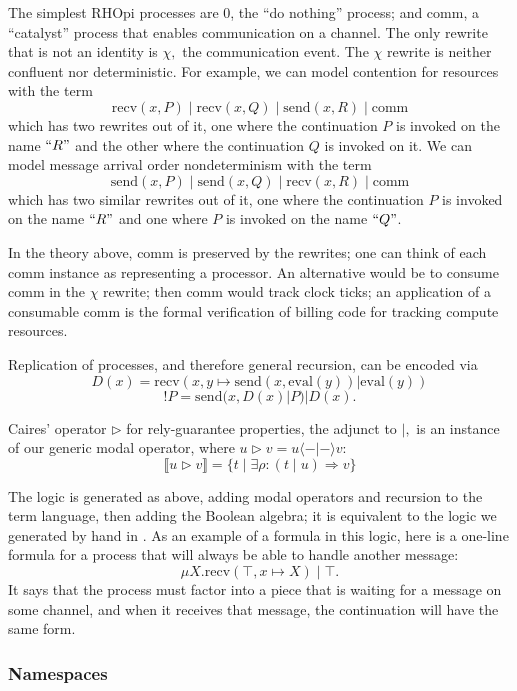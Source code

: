 \documentclass{llncs}
\newcommand{\interp}[1]{\llbracket #1 \rrbracket}
\newcommand{\maps}{\colon}
\renewcommand{\:}{\colon}
\newcommand{\send}{\mathrm{send}}
\newcommand{\recv}{\mathrm{recv}}
\newcommand{\comm}{\mathrm{comm}}
\renewcommand{\quote}[1]{``#1"}
\newcommand{\deref}[1]{\mathrm{eval}(#1)}
\begin{document}
The simplest RHOpi processes are 0, the ``do nothing'' process; and comm, a ``catalyst'' process that enables communication on a channel.  The only rewrite that is not an identity is $\chi,$ the communication event.  The $\chi$ rewrite is neither confluent nor deterministic.  For example, we can model contention for resources with the term
\[ \recv(x, P)\;|\;\recv(x, Q)\;|\;\send(x,R)\;|\;\comm \]
which has two rewrites out of it, one where the continuation $P$ is invoked on the name $\quote{R}$ and the other where the continuation $Q$ is invoked on it.  We can model message arrival order nondeterminism with the term
\[ \send(x, P)\;|\;\send(x, Q)\;|\;\recv(x,R)\;|\;\comm \]
which has two similar rewrites out of it, one where the continuation $P$ is invoked on the name $\quote{R}$ and one where $P$ is invoked on the name $\quote{Q}$.

In the theory above, comm is preserved by the rewrites; one can think of each comm instance as representing a processor.  An alternative would be to consume comm in the $\chi$ rewrite; then comm would track clock ticks; an application of a consumable comm is the formal verification of billing code for tracking compute resources.

Replication of processes, and therefore general recursion, can be encoded \cite{DBLP:journals/entcs/MeredithR05} via
\[D(x) = \recv(x, y\mapsto \send(x, \deref{y}) | \deref{y})\]
\[!P = \send(x, D(x) | P) | D(x).\]

Caires' \cite{Caires} operator $\triangleright$ for rely-guarantee properties, the adjunct to $|,$ is an instance of our generic modal operator, where $u \triangleright v = u \langle - | - \rangle v:$
\[ \interp{u \triangleright v} = \{ t \;|\; \exists \rho\maps (t\;|\;u) \Rightarrow v\} \]

The logic is generated as above, adding modal operators and recursion to the term language, then adding the Boolean algebra; it is equivalent to the logic we generated by hand in \cite{DBLP:conf/tgc/MeredithR05}.  As an example of a formula in this logic, here is a one-line formula for a process that will always be able to handle another message:
\[ \mu X. \recv(\top, x \mapsto X)\;|\;\top. \]
It says that the process must factor into a piece that is waiting for a message on some channel, and when it receives that message, the continuation will have the same form.

\subsubsection{Namespaces}
\end{document}
